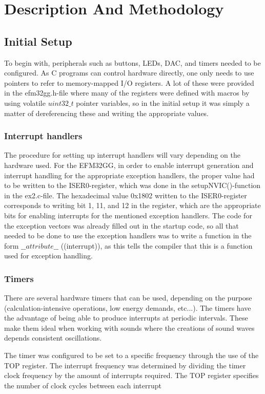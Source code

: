 \section{Description And Methodology}

\subsection{Initial Setup}
To begin with, peripherals such as buttons, LEDs, DAC, and timers needed to be configured. As C programs can control hardware directly, one only needs to use pointers to refer to memory-mapped I/O registers. A lot of these were provided in the efm32gg.h-file where many of the registers were defined with macros by using volatile $uint32\_t$ pointer variables, so in the initial setup it was simply a matter of dereferencing these and writing the appropriate values.

\subsubsection{Interrupt handlers}
The procedure for setting up interrupt handlers will vary depending on the hardware used. For the EFM32GG, in order to enable interrupt generation and interrupt handling for the appropriate exception handlers, the proper value had to be written to the ISER0-register, which was done in the setupNVIC()-function in the ex2.c-file. The hexadecimal value 0x1802 written to the ISER0-register corresponds to writing bit 1, 11, and 12 in the register, which are the appropriate bits for enabling interrupts for the mentioned exception handlers. The code for the exception vectors was already filled out in the startup code, so all that needed to be done to use the exception handlers was to write a function in the form $\_\_attribute\_\_$ ((interrupt)), as this tells the compiler that this is a function used for exception handling.

\subsubsection{Timers}
There are several hardware timers that can be used, depending on the purpose (calculation-intensive operations, low energy demands, etc...). The timers have the advantage of being able to produce interrupts at periodic intervals. These make them ideal when working with sounds where the creations of sound waves depends consistent oscillations. 

The timer was configured to be set to a specific frequency through the use of the TOP register. The interrupt frequency was determined by dividing the timer clock frequency by the amount of interrupts required. The TOP register specifies the number of clock cycles between each interrupt

